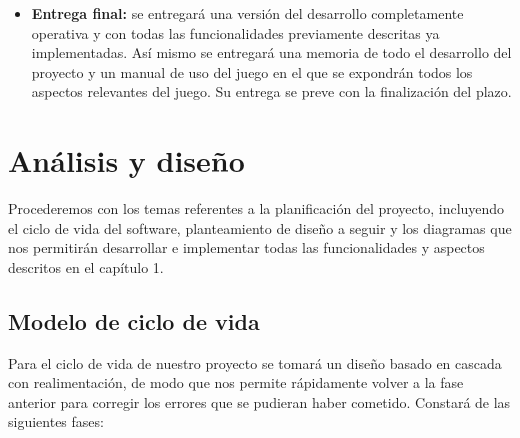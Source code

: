 \documentclass[palatino]{apuntes}
\begin{document}
\begin{itemize}
\begin{itemize}
	\item \textbf{Entrega final:} se entregará una versión del desarrollo completamente operativa y con todas las funcionalidades previamente descritas ya implementadas. Así mismo se entregará una memoria de todo el desarrollo del proyecto y un manual de uso del juego en el que se expondrán todos los aspectos relevantes del juego. Su entrega se preve con la finalización del plazo.
\end{itemize}










\chapter{Análisis y diseño}
Procederemos con los temas referentes a la planificación del proyecto, incluyendo el ciclo de vida del software, planteamiento de diseño a seguir y los diagramas que nos permitirán desarrollar e implementar todas las funcionalidades y aspectos descritos en el capítulo 1.

\section{Modelo de ciclo de vida}

Para el ciclo de vida de nuestro proyecto se tomará un diseño basado en cascada con realimentación, de modo que nos permite rápidamente volver a la fase anterior para corregir los errores que se pudieran haber cometido. Constará de las siguientes fases:


\end{itemize}
\end{document}
